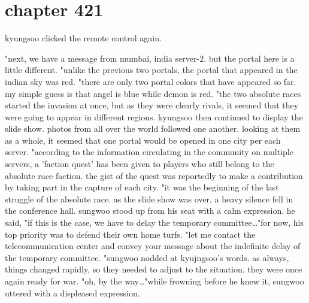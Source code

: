 \section{chapter 421}

kyungsoo clicked the remote control again.





"next, we have a message from mumbai, india server-2.
 but the portal here is a little different.
"unlike the previous two portals, the portal that appeared in the indian sky was red.
"there are only two portal colors that have appeared so far.
 my simple guess is that angel is blue while demon is red.
"the two absolute races started the invasion at once, but as they were clearly rivals, it seemed that they were going to appear in different regions.
kyungsoo then continued to display the slide show.
 photos from all over the world followed one another.
 looking at them as a whole, it seemed that one portal would be opened in one city per each server.
"according to the information circulating in the community on multiple servers, a 'faction quest' has been given to players who still belong to the absolute race faction.
 the gist of the quest was reportedly to make a contribution by taking part in the capture of each city.
"it was the beginning of the last struggle of the absolute race.
as the slide show was over, a heavy silence fell in the conference hall.
sungwoo stood up from his seat with a calm expression.
he said, "if this is the case, we have to delay the temporary committee…"for now, his top priority was to defend their own home turfs.
"let me contact the telecommunication center and convey your message about the indefinite delay of the temporary committee.
"sungwoo nodded at kyujngsoo's words.
as always, things changed rapidly, so they needed to adjust to the situation.
 they were once again ready for war.
"oh, by the way…"while frowning before he knew it, sungwoo uttered with a displeased expression.

